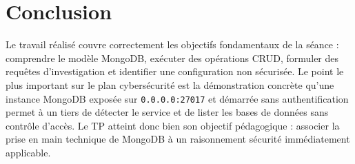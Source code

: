 \documentclass[11pt,a4paper]{article}
\begin{document}
\section{Conclusion}

Le travail réalisé couvre correctement les objectifs fondamentaux de la séance : comprendre le modèle MongoDB, exécuter des opérations CRUD, formuler des requêtes d'investigation et identifier une configuration non sécurisée. Le point le plus important sur le plan cybersécurité est la démonstration concrète qu'une instance MongoDB exposée sur \texttt{0.0.0.0:27017} et démarrée sans authentification permet à un tiers de détecter le service et de lister les bases de données sans contrôle d'accès. Le TP atteint donc bien son objectif pédagogique : associer la prise en main technique de MongoDB à un raisonnement sécurité immédiatement applicable.
\end{document}
